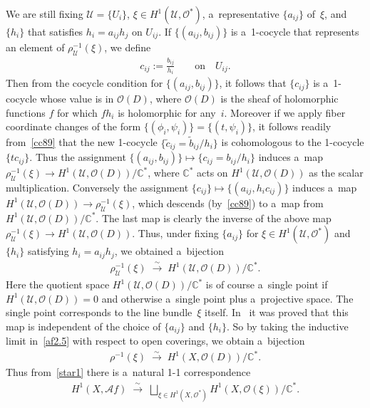 \documentclass[11pt]{article}
\numberwithin{equation}{section}
\begin{document}
We are still f\/ixing $\mathscr U=\{U_i\}$, $\xi \in H^1(\mathscr U,\mathscr O^*)$, a~representative $\{a_{ij}\}$ of~$\xi$,
and $\{h_i\}$ that satisf\/ies $h_i=a_{ij}h_j$ on $U_{ij}$.
If $\{(a_{ij},b_{ij})\}$ is a~1-cocycle that represents an element of $\rho^{-1}_{\mathscr U}(\xi)$, we def\/ine
\begin{gather*}
c_{ij}:= \frac{b_{ij}}{h_i}
\qquad
\text{on}
\quad
U_{ij}.
\end{gather*}
Then from the cocycle condition for $\{(a_{ij},b_{ij})\}$, it follows that $\{c_{ij}\}$ is a~1-cocycle whose value is in
$\mathscr O(D)$, where $\mathscr O(D)$ is the sheaf of holomorphic functions $f$ for which $fh_i$ is holomorphic for any~$i$.
Moreover if we apply f\/iber coordinate changes of the form $\{(\phi_i,\psi_i)\}=\{(t,\psi_i)\}$, it follows readily
from~\eqref{cc89} that the new 1-cocycle $\{\tilde c_{ij} = \tilde b_{ij}/h_i\}$ is cohomologous to the 1-cocycle
$\{tc_{ij}\}$.
Thus the assignment $\{(a_{ij},b_{ij})\} \mapsto \{c_{ij}=b_{ij}/h_i\}$ induces a~map $\rho_{\mathscr U}^{-1}(\xi)\to
H^1(\mathscr U,\mathscr O(D))/\mathbb{C}^*$, where $\mathbb{C}^*$ acts on $H^1(\mathscr U,\mathscr O(D))$ as the scalar
multiplication.
Conversely the assignment $\{c_{ij}\}\mapsto \{(a_{ij},h_ic_{ij})\}$ induces a~map $H^1(\mathscr U,\mathscr O(D))\to
\rho_{\mathscr U}^{-1}(\xi)$, which descends (by~\eqref{cc89}) to a~map from $H^1(\mathscr U,\mathscr
O(D))/\mathbb{C}^*$.
The last map is clearly the inverse of the above map $\rho_{\mathscr U}^{-1}(\xi)\to H^1(\mathscr U,\mathscr O(D))$.
Thus, under f\/ixing $\{a_{ij}\}$ for $\xi\in H^1(\mathscr U,\mathscr O^*)$ and $\{h_i\}$ satisfying $h_i = a_{ij}h_j$,
we obtained a~bijection
\begin{gather}
\label{af2.5}
\rho_{\mathscr U}^{-1}(\xi)
\; \stackrel{\sim}{\longrightarrow}
\;
H^1(\mathscr U,\mathscr O(D))/\mathbb{C}^*.
\end{gather}
Here the quotient space $H^1(\mathscr U,\mathscr O(D))/\mathbb{C}^*$ is of course a~single point if $H^1(\mathscr
U,\mathscr O(D))=0$ and otherwise a~single point plus a~projective space.
The single point corresponds to the line bundle~$\xi$ itself.
In~\cite{At55} it was proved that this map is independent of the choice of $\{a_{ij}\}$ and $\{h_i\}$.
So by taking the inductive limit in~\eqref{af2.5} with respect to open coverings, we obtain a~bijection
\begin{gather*}%
\rho^{-1}(\xi)
\;\stackrel{\sim}{\longrightarrow}
\;
H^1(X,\mathscr O(D))/\mathbb{C}^*.
\end{gather*}
Thus from~\eqref{star1} there is a~natural 1-1 correspondence
\begin{gather}
\label{af3}
H^1(X,\mathscr Af)
\;\stackrel{\sim}{\longrightarrow}
\;
\bigsqcup_{\xi\in H^1(X,\mathscr O^*)} H^1(X, \mathscr O(\xi)) /\mathbb{C}^*.
\end{gather}
\end{document}
